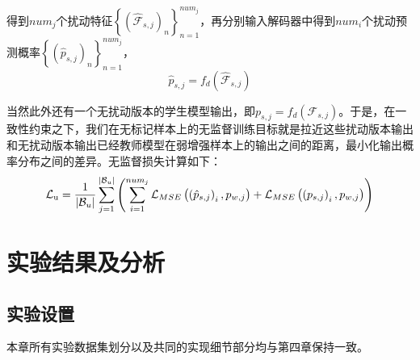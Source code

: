 \documentclass[lang=chs, degree=master, blindreview=false, adobe=false]{yanputhesis}
\begin{document}
得到$num_j$个扰动特征$ \left \{(\hat{\mathcal{F}}_{s,j})_n\right \}_{n=1}^{num_j}$，再分别输入解码器中得到$num_i$个扰动预测概率$ \left \{(\hat{p}_{s,j})_n\right \}_{n=1}^{num_j}$，
\begin{equation}
  \label{eq:perturb-decode}
  \hat{p}_{s,j}={f_d}(\hat{\mathcal{F}}_{s,j})
\end{equation}

当然此外还有一个无扰动版本的学生模型输出，即$p_{s,j}=f_d(\mathcal{F}_{s,j})$。于是，在一致性约束之下，我们在无标记样本上的无监督训练目标就是拉近这些扰动版本输出和无扰动版本输出已经教师模型在弱增强样本上的输出之间的距离，最小化输出概率分布之间的差异。无监督损失计算如下：
\begin{equation}
  \label{eq:AdPLoss_u}
  \mathcal{L}_{\text {u}}= \frac{1}{\left|\mathcal{B}_{u}\right|}\sum_{j=1}^{|\mathcal{B}_u |}\left(\sum_{i=1}^{num_{j}} \mathcal{L}_{MSE}\left(\left(\hat{p}_{s,j}\right)_{i}, p_{w,j}\right)+ \\
  \mathcal{L}_{MSE}\left(\left(p_{s,j}\right)_{i}, p_{w,j}\right)\right)
\end{equation}
\section{实验结果及分析}
\subsection{实验设置}
本章所有实验数据集划分以及共同的实现细节部分均与第四章保持一致。
\end{document}
